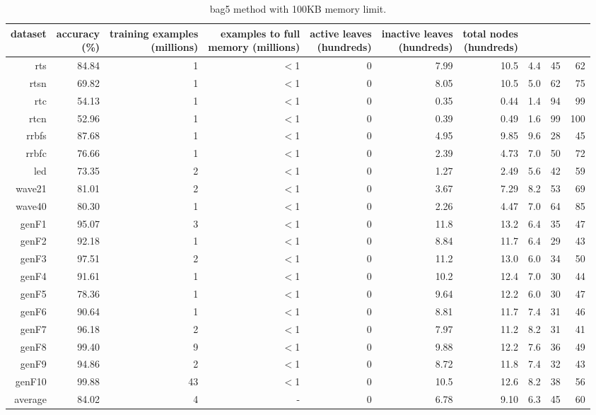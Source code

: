 \begin{table}
\caption{{\sc bag5} method with 100KB memory limit.}
\label{tab:bag5-100k}
\centering
\begin{tabular}{|r|r|r|r|r|r|r|r|r|r|}
\hline
dataset	&
\rotatebox{90}{\parbox{9em}{accuracy\\(\%)}} &
\rotatebox{90}{\parbox{9em}{training examples\\(millions)}} &
\rotatebox{90}{\parbox{9em}{examples to full\\memory (millions)}} &
\rotatebox{90}{\parbox{9em}{active leaves\\(hundreds)}} &
\rotatebox{90}{\parbox{9em}{inactive leaves\\(hundreds)}} &
\rotatebox{90}{\parbox{9em}{total nodes\\(hundreds)}} &
\rotatebox{90}{\parbox{9em}{average tree depth}}	&
\rotatebox{90}{\parbox{9em}{training speed (\%)}} &
\rotatebox{90}{\parbox{9em}{prediction speed (\%)}} \\
\hline
{\sc rts} & 84.84 & 1 & $<$1 & 0 & 7.99 & 10.5 & 4.4 & 45 & 62 \\
{\sc rtsn} & 69.82 & 1 & $<$1 & 0 & 8.05 & 10.5 & 5.0 & 62 & 75 \\
{\sc rtc} & 54.13 & 1 & $<$1 & 0 & 0.35 & 0.44 & 1.4 & 94 & 99 \\
{\sc rtcn} & 52.96 & 1 & $<$1 & 0 & 0.39 & 0.49 & 1.6 & 99 & 100 \\
{\sc rrbfs} & 87.68 & 1 & $<$1 & 0 & 4.95 & 9.85 & 9.6 & 28 & 45 \\
{\sc rrbfc} & 76.66 & 1 & $<$1 & 0 & 2.39 & 4.73 & 7.0 & 50 & 72 \\
{\sc led} & 73.35 & 2 & $<$1 & 0 & 1.27 & 2.49 & 5.6 & 42 & 59 \\
{\sc wave21} & 81.01 & 2 & $<$1 & 0 & 3.67 & 7.29 & 8.2 & 53 & 69 \\
{\sc wave40} & 80.30 & 1 & $<$1 & 0 & 2.26 & 4.47 & 7.0 & 64 & 85 \\
{\sc genF1} & 95.07 & 3 & $<$1 & 0 & 11.8 & 13.2 & 6.4 & 35 & 47 \\
{\sc genF2} & 92.18 & 1 & $<$1 & 0 & 8.84 & 11.7 & 6.4 & 29 & 43 \\
{\sc genF3} & 97.51 & 2 & $<$1 & 0 & 11.2 & 13.0 & 6.0 & 34 & 50 \\
{\sc genF4} & 91.61 & 1 & $<$1 & 0 & 10.2 & 12.4 & 7.0 & 30 & 44 \\
{\sc genF5} & 78.36 & 1 & $<$1 & 0 & 9.64 & 12.2 & 6.0 & 30 & 47 \\
{\sc genF6} & 90.64 & 1 & $<$1 & 0 & 8.81 & 11.7 & 7.4 & 31 & 46 \\
{\sc genF7} & 96.18 & 2 & $<$1 & 0 & 7.97 & 11.2 & 8.2 & 31 & 41 \\
{\sc genF8} & 99.40 & 9 & $<$1 & 0 & 9.88 & 12.2 & 7.6 & 36 & 49 \\
{\sc genF9} & 94.86 & 2 & $<$1 & 0 & 8.72 & 11.8 & 7.4 & 32 & 43 \\
{\sc genF10} & 99.88 & 43 & $<$1 & 0 & 10.5 & 12.6 & 8.2 & 38 & 56 \\
\hline
average & 84.02 & 4 &  -  & 0 & 6.78 & 9.10 & 6.3 & 45 & 60 \\
\hline
\end{tabular}
\end{table}
